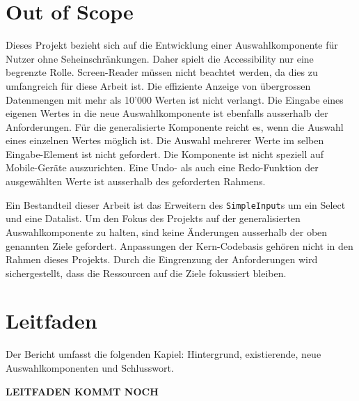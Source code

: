 \section{Out of Scope}

Dieses Projekt bezieht sich auf die Entwicklung einer Auswahlkomponente für Nutzer ohne Seheinschränkungen.
Daher spielt die Accessibility nur eine begrenzte Rolle.
Screen-Reader müssen nicht beachtet werden, da dies zu umfangreich für diese Arbeit ist.
Die effiziente Anzeige von übergrossen Datenmengen mit mehr als 10'000 Werten ist nicht verlangt.
Die Eingabe eines eigenen Wertes in die neue Auswahlkomponente ist ebenfalls ausserhalb der Anforderungen.
Für die generalisierte Komponente reicht es, wenn die Auswahl eines einzelnen Wertes möglich ist.
Die Auswahl mehrerer Werte im selben Eingabe-Element ist nicht gefordert.
Die Komponente ist nicht speziell auf Mobile-Geräte auszurichten. 
Eine Undo- als auch eine Redo-Funktion der ausgewählten Werte ist ausserhalb des geforderten Rahmens. 

Ein Bestandteil dieser Arbeit ist das Erweitern des \texttt{SimpleInput}s um ein Select und eine Datalist.
Um den Fokus des Projekts auf der generalisierten Auswahlkomponente zu halten, sind keine Änderungen ausserhalb der oben genannten Ziele gefordert.
Anpassungen der Kern-Codebasis gehören nicht in den Rahmen dieses Projekts.
Durch die Eingrenzung der Anforderungen wird sichergestellt, dass die Ressourcen auf die Ziele fokussiert bleiben.


\section{Leitfaden}

Der Bericht umfasst die folgenden Kapiel: Hintergrund, existierende, neue Auswahlkomponenten und Schlusswort. 

{\color{red} \textbf{LEITFADEN KOMMT NOCH}}

